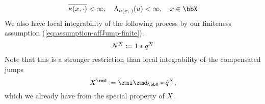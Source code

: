 \begin{equation*}
  \overline{\affDist(\stateVar, \cdot)} < \infty, \quad \ode_{\affDist(\stateVar, \cdot)}(\momentVar) < \infty, \quad \stateVar \in \stateSpace
\end{equation*}
We also have local integrability of the following process by our finiteness assumption (\ref{eq:assumption-affJump-finite}).
\begin{equation}
  \label{eq:arrivals}
  N^X \coloneqq 1 \ast q^X
\end{equation}
Note that this is a stronger restriction than local integrability of the compensated jumps
\begin{equation}
  \label{eq:jumps}
  \X^\rmd \defeq \id_\vecSpace \ast \compensate{\jumpMeas^\X},
\end{equation}
which we already have from the special property of $X$.

